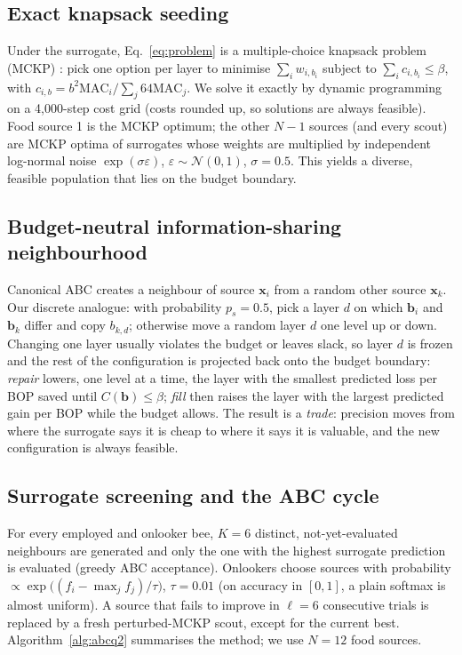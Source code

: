 \documentclass[11pt,a4paper]{article}
\begin{document}
\subsection{Exact knapsack seeding}
Under the surrogate, Eq.~\eqref{eq:problem} is a multiple-choice knapsack problem (MCKP)
\citep{Kellerer2004}: pick one option per layer to minimise $\sum_i w_{i,b_i}$ subject to
$\sum_i c_{i,b_i}\le\beta$, with $c_{i,b}=b^2\mathrm{MAC}_i/\sum_j64\mathrm{MAC}_j$. We solve it exactly
by dynamic programming on a 4{,}000-step cost grid (costs rounded up, so solutions are always
feasible). Food source 1 is the MCKP optimum; the other $N-1$ sources (and every scout) are MCKP
optima of surrogates whose weights are multiplied by independent log-normal noise
$\exp(\sigma\varepsilon)$, $\varepsilon\sim\mathcal N(0,1)$, $\sigma=0.5$. This yields a diverse,
feasible population that lies on the budget boundary.

\subsection{Budget-neutral information-sharing neighbourhood}
Canonical ABC creates a neighbour of source $\mathbf x_i$ from a random other source $\mathbf x_k$.
Our discrete analogue: with probability $p_s=0.5$, pick a layer $d$ on which $\mathbf b_i$ and
$\mathbf b_k$ differ and copy $b_{k,d}$; otherwise move a random layer $d$ one level up or down.
Changing one layer usually violates the budget or leaves slack, so layer $d$ is frozen and the rest of
the configuration is projected back onto the budget boundary: \emph{repair} lowers, one level at a
time, the layer with the smallest predicted loss per BOP saved until $C(\mathbf b)\le\beta$;
\emph{fill} then raises the layer with the largest predicted gain per BOP while the budget allows. The
result is a \emph{trade}: precision moves from where the surrogate says it is cheap to where it says it
is valuable, and the new configuration is always feasible.

\subsection{Surrogate screening and the ABC cycle}
For every employed and onlooker bee, $K=6$ distinct, not-yet-evaluated neighbours are generated and
only the one with the highest surrogate prediction is evaluated (greedy ABC acceptance). Onlookers
choose sources with probability $\propto\exp\!\big((f_i-\max_j f_j)/\tau\big)$, $\tau=0.01$ (on accuracy
in $[0,1]$, a plain softmax is almost uniform). A source that fails to improve in
$\ell=6$ consecutive trials is replaced by a fresh perturbed-MCKP scout, except for the current best.
Algorithm~\ref{alg:abcq2} summarises the method; we use $N=12$ food sources.
\end{document}
